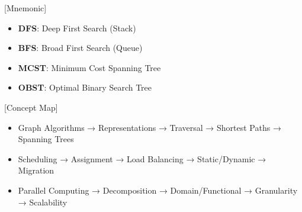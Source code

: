 \documentclass[12pt]{article}
\begin{document}
[Mnemonic]
\begin{itemize}
    \item \textbf{DFS}: Deep First Search (Stack)
    \item \textbf{BFS}: Broad First Search (Queue)
    \item \textbf{MCST}: Minimum Cost Spanning Tree
    \item \textbf{OBST}: Optimal Binary Search Tree
\end{itemize}

[Concept Map]
\begin{itemize}
    \item Graph Algorithms → Representations → Traversal → Shortest Paths → Spanning Trees
    \item Scheduling → Assignment → Load Balancing → Static/Dynamic → Migration
    \item Parallel Computing → Decomposition → Domain/Functional → Granularity → Scalability
\end{itemize}
\end{document}
